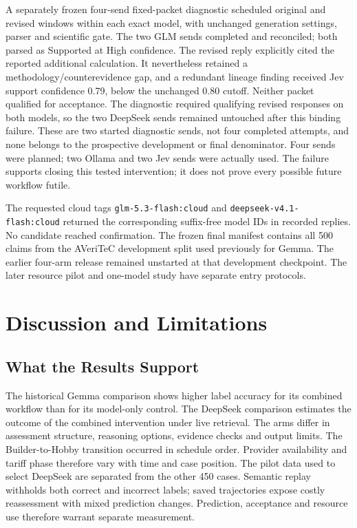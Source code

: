 \documentclass[conference]{IEEEtran}
\begin{document}
A separately frozen four-send fixed-packet diagnostic scheduled original and revised windows within each exact model, with unchanged generation settings, parser and scientific gate. The two GLM sends completed and reconciled; both parsed as Supported at High confidence. The revised reply explicitly cited the reported additional calculation. It nevertheless retained a methodology/counterevidence gap, and a redundant lineage finding received Jev support confidence 0.79, below the unchanged 0.80 cutoff. Neither packet qualified for acceptance. The diagnostic required qualifying revised responses on both models, so the two DeepSeek sends remained untouched after this binding failure. These are two started diagnostic sends, not four completed attempts, and none belongs to the prospective development or final denominator. Four sends were planned; two Ollama and two Jev sends were actually used. The failure supports closing this tested intervention; it does not prove every possible future workflow futile.

The requested cloud tags \texttt{glm-5.3-flash:cloud} and \texttt{deepseek-v4.1-flash:cloud} returned the corresponding suffix-free model IDs in recorded replies. No candidate reached confirmation. The frozen final manifest contains all 500 claims from the AVeriTeC development split used previously for Gemma. The earlier four-arm release remained unstarted at that development checkpoint. The later resource pilot and one-model study have separate entry protocols.

\section{Discussion and Limitations}
\subsection{What the Results Support}
The historical Gemma comparison shows higher label accuracy for its combined workflow than for its model-only control. The DeepSeek comparison estimates the outcome of the combined intervention under live retrieval. The arms differ in assessment structure, reasoning options, evidence checks and output limits. The Builder-to-Hobby transition occurred in schedule order. Provider availability and tariff phase therefore vary with time and case position. The pilot data used to select DeepSeek are separated from the other 450 cases. Semantic replay withholds both correct and incorrect labels; saved trajectories expose costly reassessment with mixed prediction changes. Prediction, acceptance and resource use therefore warrant separate measurement.
\end{document}
